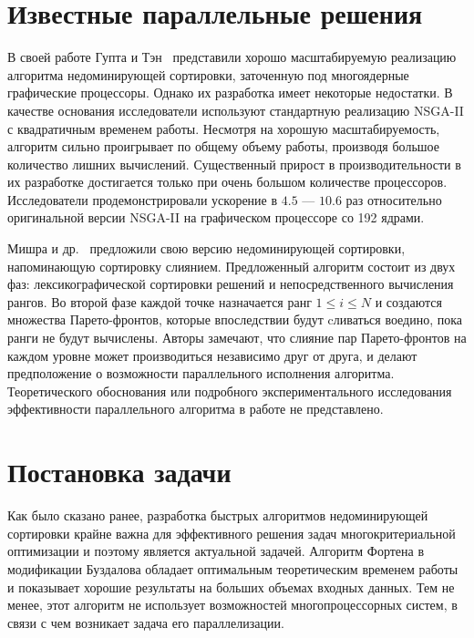 

\section{Известные параллельные решения}
В своей работе Гупта и Тэн~\cite{gupta15} представили хорошо масштабируемую реализацию алгоритма недоминирующей сортировки, заточенную под многоядерные графические процессоры.
Однако их разработка имеет некоторые недостатки. В качестве основания исследователи используют стандартную реализацию NSGA-II с квадратичным временем работы.
Несмотря на хорошую масштабируемость, алгоритм сильно проигрывает по общему объему работы, производя большое количество лишних вычислений.
Существенный прирост в производительности в их разработке достигается только при очень большом количестве процессоров. 
Исследователи продемонстрировали ускорение в $4.5$ --- $10.6$ раз относительно оригинальной версии NSGA-II на графическом процессоре со 192 ядрами.

Мишра и др.~\cite{mishra16} предложили свою версию недоминирующей сортировки, напоминающую сортировку слиянием.
Предложенный алгоритм состоит из двух фаз: лексикографической сортировки решений и непосредственного вычисления рангов.
Во второй фазе каждой точке назначается ранг $1\leq i \leq N$ и создаются множества Парето-фронтов, которые впоследствии будут cливаться воедино, пока ранги не будут вычислены.
Авторы замечают, что слияние пар Парето-фронтов на каждом уровне может производиться независимо друг от друга, и делают предположение о возможности параллельного исполнения алгоритма.
Теоретического обоснования или подробного экспериментального исследования эффективности параллельного алгоритма в работе не представлено.

\section{Постановка задачи}
Как было сказано ранее, разработка быстрых алгоритмов недоминирующей сортировки крайне важна для эффективного решения задач многокритериальной оптимизации и поэтому является актуальной задачей.
Алгоритм Фортена в модификации Буздалова обладает оптимальным теоретическим временем работы и показывает хорошие результаты на больших объемах входных данных.
Тем не менее, этот алгоритм не использует возможностей многопроцессорных систем, в связи с чем возникает задача его параллелизации.
